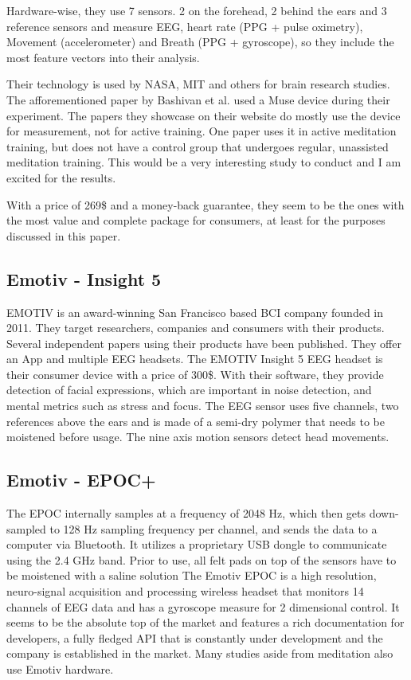 \documentclass{llncs} %
\begin{document}
Hardware-wise, they use 7 sensors. 2 on the forehead, 2 behind the ears and 3 reference sensors and measure EEG, heart rate (PPG + pulse oximetry), Movement (accelerometer) and Breath (PPG + gyroscope), so they include the most feature vectors into their analysis. 
\medskip

Their technology is used by NASA, MIT and others for brain research studies. The afforementioned paper by Bashivan et al. \cite{Bashivan: et al} used a Muse device during their experiment. The papers they showcase on their website do mostly use the device for measurement, not for active training. One paper uses it in active meditation training, but does not have a control group that undergoes regular, unassisted meditation training. This would be a very interesting study to conduct and I am excited for the results. 
\medskip

With a price of 269\$ and a money-back guarantee, they seem to be the ones with the most value and complete package for consumers, at least for the purposes discussed in this paper. 
\subsection{Emotiv - Insight 5}
EMOTIV is an award-winning San Francisco based BCI company founded in 2011. They target researchers, companies and consumers with their products. Several independent papers using their products have been published. They offer an App and multiple EEG headsets. The EMOTIV Insight 5 EEG headset is their consumer device with a price of 300\$. With their software, they provide detection of facial expressions, which are important in noise detection, and mental metrics such as stress and focus. The EEG sensor uses five channels, two references above the ears and is made of a semi-dry polymer that needs to be moistened before usage. The nine axis motion sensors detect head movements. \cite{Emotiv1}


\subsection{Emotiv - EPOC+}
The EPOC internally samples at a frequency of 2048 Hz, which then gets down-sampled to 128 Hz sampling frequency per channel, and sends the data to a computer via Bluetooth. It utilizes a proprietary USB dongle to communicate using the 2.4 GHz band. Prior to use, all felt pads on top of the sensors have to be moistened with a saline solution \cite{Kushaba}
The Emotiv EPOC is a high resolution, neuro-signal acquisition and processing wireless headset that monitors 14 channels of EEG data and has a gyroscope measure for 2 dimensional control. It seems to be the absolute top of the market and features a rich documentation for developers, a fully fledged API that is constantly under development and the company is established in the market. Many studies aside from meditation also use Emotiv hardware.
\medskip
\end{document}
